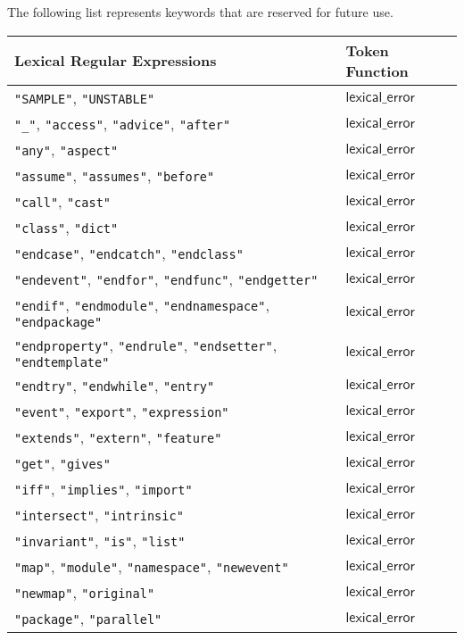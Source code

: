 \documentclass{book}
\newcommand\lexicalerror[0]{\textsf{lexical\_error}}
\begin{document}
The following list represents keywords that are reserved for future use.
\begin{center}
\begin{tabular}{ll}
\textbf{Lexical Regular Expressions} & \textbf{Token Function}\\
\hline
\texttt{"SAMPLE"}, \texttt{"UNSTABLE"} & $\lexicalerror$ \\
\texttt{"\_"}, \texttt{"access"}, \texttt{"advice"}, \texttt{"after"} & $\lexicalerror$ \\
\texttt{"any"}, \texttt{"aspect"} & $\lexicalerror$ \\
\texttt{"assume"}, \texttt{"assumes"}, \texttt{"before"} & $\lexicalerror$ \\
\texttt{"call"}, \texttt{"cast"} & $\lexicalerror$ \\
\texttt{"class"}, \texttt{"dict"} & $\lexicalerror$ \\
\texttt{"endcase"}, \texttt{"endcatch"}, \texttt{"endclass"} & $\lexicalerror$ \\
\texttt{"endevent"}, \texttt{"endfor"}, \texttt{"endfunc"}, \texttt{"endgetter"} & $\lexicalerror$ \\
\texttt{"endif"}, \texttt{"endmodule"}, \texttt{"endnamespace"}, \texttt{"endpackage"} & $\lexicalerror$ \\
\texttt{"endproperty"}, \texttt{"endrule"}, \texttt{"endsetter"}, \texttt{"endtemplate"} & $\lexicalerror$ \\
\texttt{"endtry"}, \texttt{"endwhile"}, \texttt{"entry"} & $\lexicalerror$ \\
\texttt{"event"}, \texttt{"export"}, \texttt{"expression"} & $\lexicalerror$ \\
\texttt{"extends"}, \texttt{"extern"}, \texttt{"feature"} & $\lexicalerror$ \\
\texttt{"get"}, \texttt{"gives"} & $\lexicalerror$ \\
\texttt{"iff"}, \texttt{"implies"}, \texttt{"import"} & $\lexicalerror$ \\
\texttt{"intersect"}, \texttt{"intrinsic"} & $\lexicalerror$ \\
\texttt{"invariant"}, \texttt{"is"}, \texttt{"list"} & $\lexicalerror$ \\
\texttt{"map"}, \texttt{"module"}, \texttt{"namespace"}, \texttt{"newevent"} & $\lexicalerror$ \\
\texttt{"newmap"}, \texttt{"original"} & $\lexicalerror$ \\
\texttt{"package"}, \texttt{"parallel"} & $\lexicalerror$ \\

\end{tabular}
\end{center}
\end{document}
